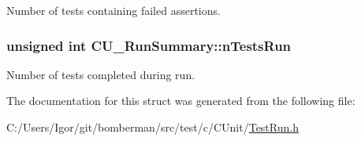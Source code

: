 Number of tests containing failed assertions. 

\hypertarget{struct_c_u___run_summary_a15da425a520dfb2628febc5313c92aa7}{
\subsubsection[{n\+Tests\+Run}]{\setlength{\rightskip}{0pt plus 5cm}unsigned int C\+U\+\_\+\+Run\+Summary\+::n\+Tests\+Run}}\label{struct_c_u___run_summary_a15da425a520dfb2628febc5313c92aa7}


Number of tests completed during run. 



The documentation for this struct was generated from the following file\+:\begin{DoxyCompactItemize}
\item 
C\+:/\+Users/\+Igor/git/bomberman/src/test/c/\+C\+Unit/\hyperlink{_test_run_8h}{Test\+Run.\+h}\end{DoxyCompactItemize}
